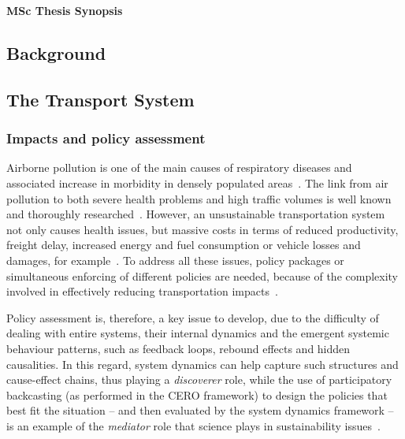 \documentclass[a4paper,fontsize=10pt,bibliography=totoc]{scrartcl}
\newcommand{\sref}[1]{Section~\ref{#1}}
\newcommand{\titlemake}[1]{%
		\begin{center}
				\Large\sffamily\bfseries{#1}
		\end{center}
}
\newcommand{\subtitlemake}[1]{%
	\begin{center}
		\begingroup
			\large\sffamily{#1}
		\endgroup
	\end{center}
}
\begin{document}
\pagestyle{fancy}
\fancyhf{} %
\rhead{\footnotesize \today}
\rfoot{\footnotesize \thepage}

\titlemake{ %
MSc Thesis Synopsis
}

\begin{multicols}{2}

\section{Background}
\label{s:background}
\subsection{The Transport System}
\subsubsection*{Impacts and policy assessment}
Airborne pollution is one of the main causes of respiratory diseases and associated increase in morbidity in densely populated areas~\parencite{vimercati2011airpollutionmorbidity,who2006air}. The link from air pollution to both severe health problems and high traffic volumes is well known and thoroughly researched~\parencite{who2006air}. However, an unsustainable transportation system not only causes health issues, but massive costs in terms of reduced productivity, freight delay, increased energy and fuel consumption or vehicle losses and damages, for example~\parencite{lizeng2012costcongestion}. To address all these issues, policy packages or simultaneous enforcing of different policies are needed, because of the complexity involved in effectively reducing transportation impacts~\parencite[ch. 3, p. 45]{garcia2014travel}.

Policy assessment is, therefore, a key issue to develop, due to the difficulty of dealing with entire systems, their internal dynamics and the emergent systemic behaviour patterns, such as feedback loops, rebound effects and hidden causalities. In this regard, system dynamics can help capture such structures and cause-effect chains, thus playing a \textit{discoverer} role, while the use of participatory backcasting (as performed in the CERO framework) to design the policies that best fit the situation -- and then evaluated by the system dynamics framework -- is an example of the \textit{mediator} role that science plays in sustainability issues~\parencite{ozawa1996science}.


\end{multicols}
\end{document}

